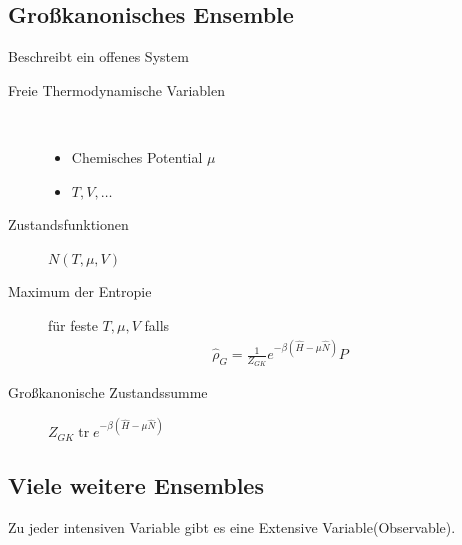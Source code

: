 \documentclass[11pt]{article}
\theoremstyle{plain}
\newcommand{\trace}{\operatorname{tr}}
\begin{document}
\subsection*{Gro\ss{}kanonisches Ensemble}
Beschreibt ein offenes System
\begin{description}
  \item[Freie Thermodynamische Variablen]  $ $
    \begin{itemize}
      \item Chemisches Potential $\mu$
      \item $T, V, \ldots$
    \end{itemize}
  \item[Zustandsfunktionen] $N(T, \mu, V)$
  \item[Maximum der Entropie] f\"ur feste $T, \mu, V$ falls
    \begin{align*}
      \hat{\rho}_G = \frac{1}{Z_{GK}} e^{-\beta(\hat{H}- \mu \hat{N})} P
    \end{align*}
  \item[Gro\ss{}kanonische Zustandssumme] $Z_{GK} 
    \trace e^{-\beta(\hat{H}- \mu \hat{N})} $
\end{description}
\subsection*{Viele weitere Ensembles}
Zu jeder intensiven Variable gibt es eine Extensive Variable(Observable).

\begin{center}
\end{center}
\end{document}
